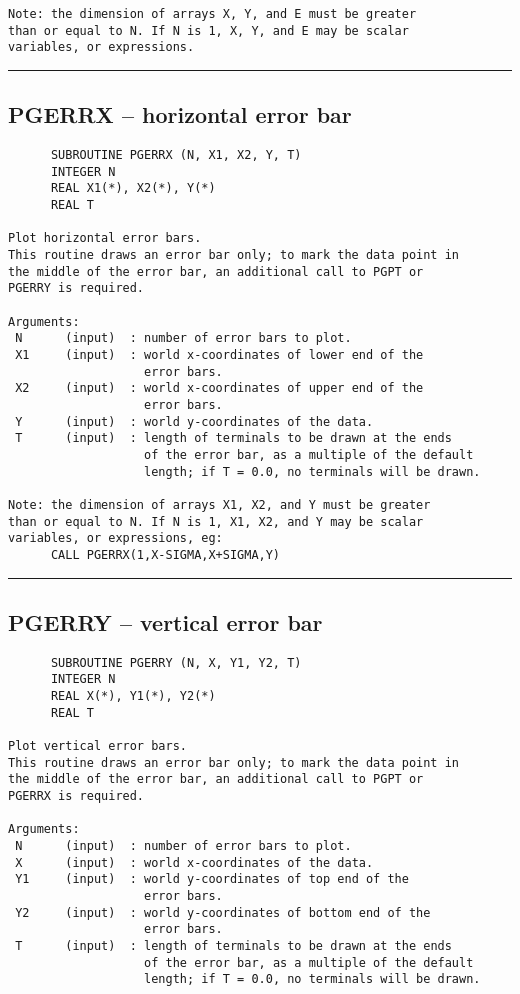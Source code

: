 {\begin{verbatim}
Note: the dimension of arrays X, Y, and E must be greater
than or equal to N. If N is 1, X, Y, and E may be scalar
variables, or expressions.
\end{verbatim}
\hrule


\subsection*{PGERRX -- horizontal error bar }
\begin{verbatim}
      SUBROUTINE PGERRX (N, X1, X2, Y, T)
      INTEGER N
      REAL X1(*), X2(*), Y(*)
      REAL T

Plot horizontal error bars.
This routine draws an error bar only; to mark the data point in
the middle of the error bar, an additional call to PGPT or
PGERRY is required.

Arguments:
 N      (input)  : number of error bars to plot.
 X1     (input)  : world x-coordinates of lower end of the
                   error bars.
 X2     (input)  : world x-coordinates of upper end of the
                   error bars.
 Y      (input)  : world y-coordinates of the data.
 T      (input)  : length of terminals to be drawn at the ends
                   of the error bar, as a multiple of the default
                   length; if T = 0.0, no terminals will be drawn.

Note: the dimension of arrays X1, X2, and Y must be greater
than or equal to N. If N is 1, X1, X2, and Y may be scalar
variables, or expressions, eg:
      CALL PGERRX(1,X-SIGMA,X+SIGMA,Y)
\end{verbatim}
\hrule


\subsection*{PGERRY -- vertical error bar }
\begin{verbatim}
      SUBROUTINE PGERRY (N, X, Y1, Y2, T)
      INTEGER N
      REAL X(*), Y1(*), Y2(*)
      REAL T

Plot vertical error bars.
This routine draws an error bar only; to mark the data point in
the middle of the error bar, an additional call to PGPT or
PGERRX is required.

Arguments:
 N      (input)  : number of error bars to plot.
 X      (input)  : world x-coordinates of the data.
 Y1     (input)  : world y-coordinates of top end of the
                   error bars.
 Y2     (input)  : world y-coordinates of bottom end of the
                   error bars.
 T      (input)  : length of terminals to be drawn at the ends
                   of the error bar, as a multiple of the default
                   length; if T = 0.0, no terminals will be drawn.


\end{verbatim}}
